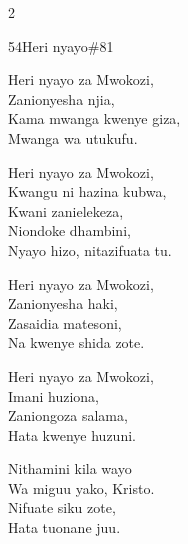 \documentclass{article}
\begin{document}
\begin{multicols}{2}
\begin{hymn}{54}{Heri nyayo}{\#81}
\begin{stanza}
Heri nyayo za Mwokozi,\\
Zanionyesha njia,\\
Kama mwanga kwenye giza,\\
Mwanga wa utukufu.
\end{stanza}
\begin{chorus}
Heri nyayo za Mwokozi,\\
Kwangu ni hazina kubwa,\\
Kwani zanielekeza,\\
Niondoke dhambini,\\
Nyayo hizo, nitazifuata tu.
\end{chorus}
\begin{stanza}
Heri nyayo za Mwokozi,\\
Zanionyesha haki,\\
Zasaidia matesoni,\\
Na kwenye shida zote.
\end{stanza}
\begin{stanza}
Heri nyayo za Mwokozi,\\
Imani huziona,\\
Zaniongoza salama,\\
Hata kwenye huzuni.
\end{stanza}
\begin{stanza}
Nithamini kila wayo\\
Wa miguu yako, Kristo.\\
Nifuate siku zote,\\
Hata tuonane juu.
\end{stanza}
\end{hymn}


\end{multicols}
\end{document}

